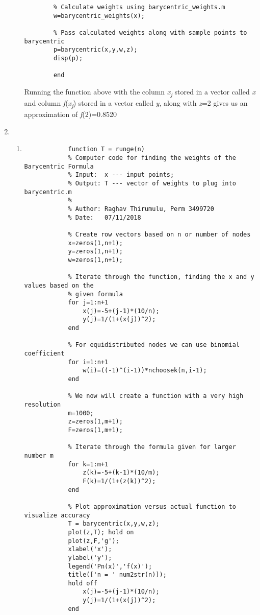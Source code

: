\documentclass{article}
\begin{document}
\begin{enumerate}
\begin{enumerate}
\begin{lstlisting}
        % Calculate weights using barycentric_weights.m
        w=barycentric_weights(x);

        % Pass calculated weights along with sample points to barycentric
        p=barycentric(x,y,w,z);
        disp(p);

        end
        \end{lstlisting}
        
        Running the function above with the column \textit{x\textsubscript{j}} stored in a vector called \textit{x} and column \textit{f}(\textit{x\textsubscript{j}}) stored in a vector called \textit{y}, along with \textit{z}=2 gives us an approximation of \textit{f}(2)=0.8520
        
        
        
    \end{enumerate}
    \item %
        \begin{enumerate}
            \item 
            \begin{lstlisting}
            function T = runge(n)
            % Computer code for finding the weights of the Barycentric Formula
            % Input:  x --- input points;
            % Output: T --- vector of weights to plug into barycentric.m
            %
            % Author: Raghav Thirumulu, Perm 3499720
            % Date:   07/11/2018

            % Create row vectors based on n or number of nodes
            x=zeros(1,n+1);
            y=zeros(1,n+1);
            w=zeros(1,n+1);

            % Iterate through the function, finding the x and y values based on the
            % given formula
            for j=1:n+1
                x(j)=-5+(j-1)*(10/n);
                y(j)=1/(1+(x(j))^2);
            end

            % For equidistributed nodes we can use binomial coefficient
            for i=1:n+1
                w(i)=((-1)^(i-1))*nchoosek(n,i-1);
            end

            % We now will create a function with a very high resolution
            m=1000;
            z=zeros(1,m+1);
            F=zeros(1,m+1);

            % Iterate through the formula given for larger number m
            for k=1:m+1
                z(k)=-5+(k-1)*(10/m);
                F(k)=1/(1+(z(k))^2);
            end

            % Plot approximation versus actual function to visualize accuracy
            T = barycentric(x,y,w,z);
            plot(z,T); hold on
            plot(z,F,'g');
            xlabel('x');
            ylabel('y');
            legend('Pn(x)','f(x)');
            title(['n = ' num2str(n)]);
            hold off
                x(j)=-5+(j-1)*(10/n);
                y(j)=1/(1+(x(j))^2);
            end
            

\end{lstlisting}
\end{enumerate}
\end{enumerate}
\end{document}
